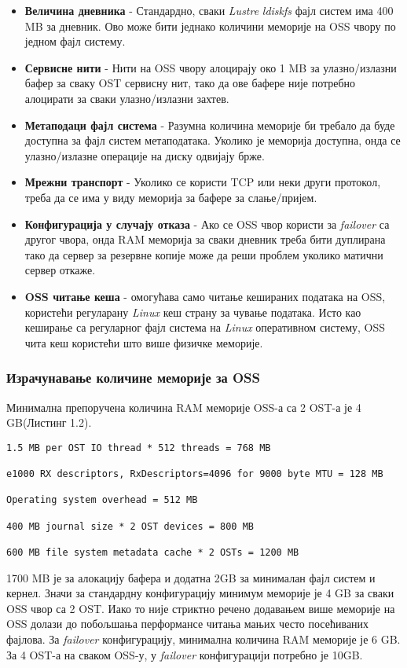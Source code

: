  
\begin{itemize}
\item \textbf{Величина дневника} - Стандардно, сваки   \textit{Lustre} \textit{ldiskfs} фајл систем има 400 MB за дневник. Ово може бити једнако количини меморије на  OSS чвору по једном фајл систему.

\item \textbf{Сервисне нити} - Нити на OSS чвору алоцирају око 1 MB за улазно/излазни бафер за сваку OST сервисну нит, тако да ове бафере није потребно алоцирати за сваки улазно/излазни захтев.

\item \textbf{Метаподаци фајл система} - Разумна количина меморије би требало да буде доступна за фајл систем метаподатака. Уколико је меморија доступна, онда се улазно/излазне операције на диску одвијају брже.

\item \textbf{Мрежни транспорт} - Уколико се користи  TCP или неки други протокол, треба да се има у виду меморија за бафере за слање/пријем.

\item \textbf{Конфигурација у случају отказа} - Ако се OSS чвор користи за \textit{failover} са другог чвора, онда RAM меморија за сваки дневник треба бити дуплирана тако да сервер за резервне копије може да реши проблем уколико матични сервер откаже.

\item \textbf{OSS читање кеша} - омогућава само читање кешираних података на OSS, користећи регуларану \textit{Linux} кеш страну за чување података. Исто као кеширање са регуларног фајл система на \textit{Linux} оперативном систему, OSS чита кеш користећи што више физичке меморије.
\end{itemize}

\subsubsection{Израчунавање количине меморије за  OSS }

Минимална препоручена количина RAM меморије OSS-а са 2 OST-а је 4 GB(Листинг 1.2).


\begin{lstlisting}[style=nonumbers,frame=single, caption=Препоручена количина RAM меморије]
1.5 MB per OST IO thread * 512 threads = 768 MB

e1000 RX descriptors, RxDescriptors=4096 for 9000 byte MTU = 128 MB

Operating system overhead = 512 MB

400 MB journal size * 2 OST devices = 800 MB

600 MB file system metadata cache * 2 OSTs = 1200 MB
\end{lstlisting}

1700 MB је за алокацију бафера и додатна 2GB за минималан фајл систем и кернел. Значи за стандардну конфигурацију минимум  меморије је 4 GB за сваки OSS чвор са 2 OST. Иако то није стриктно речено додавањем више меморије на OSS долази до побољшања перформансе читања мањих често посећиваних фајлова. 
За \textit{failover} конфигурацију, минимална количина RAM меморије је 6 GB. За 4 OST-а на сваком OSS-у, у \textit{failover} конфигурацији потребно је 10GB.
